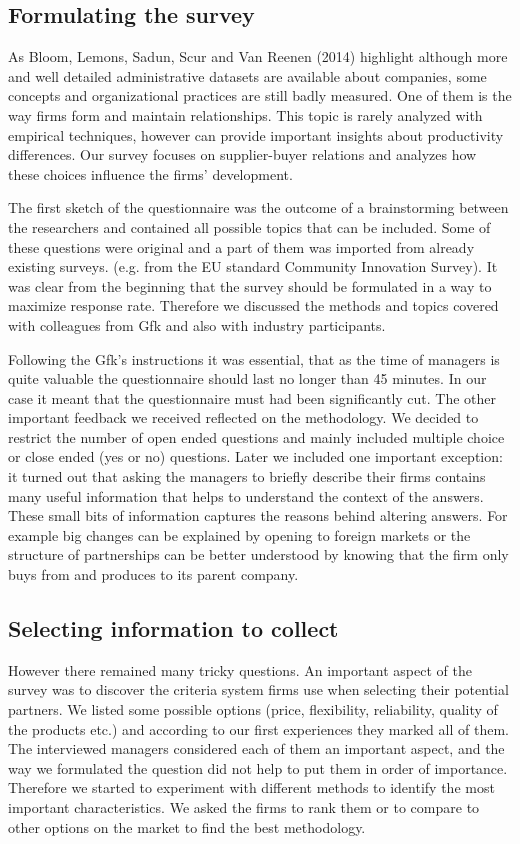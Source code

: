\documentclass[final, dvipsnames, authoryear,12pt]{elsarticle}
\begin{document}
\subsection{Formulating the survey }

As Bloom, Lemons, Sadun, Scur and Van Reenen (2014) highlight although more and well detailed administrative datasets are available about companies, some concepts and organizational practices are still badly measured. One of them is the way firms form and maintain relationships. This topic is rarely analyzed with empirical techniques, however can provide important insights about productivity differences. Our survey focuses on supplier-buyer relations and analyzes how these choices influence the firms’ development.

The first sketch of the questionnaire was the outcome of a brainstorming between the researchers and contained all possible topics that can be included. Some of these questions were original and a part of them was imported from already existing surveys. (e.g. from the EU standard Community Innovation Survey). It was clear from the beginning that the survey should be formulated in a way to maximize response rate. Therefore we discussed the methods and topics covered with colleagues from Gfk and also with industry participants.

Following the Gfk’s instructions it was essential, that as the time of managers is quite valuable the questionnaire should last no longer than 45 minutes. In our case it meant that the questionnaire must had been significantly cut. The other important feedback we received reflected on the methodology. We decided to restrict the number of open ended questions and mainly included multiple choice or close ended (yes or no) questions. Later we included one important exception: it turned out that asking the managers to briefly describe their firms contains many useful information that helps to understand the context of the answers. These small bits of information captures the reasons behind altering answers. For example big changes can be explained by opening to foreign markets or the structure of partnerships can be better understood by knowing that the firm only buys from and produces to its parent company.

\subsection{Selecting information to collect}

However there remained many tricky questions. An important aspect of the survey was to discover the criteria system firms use when selecting their potential partners. We listed some possible options (price, flexibility, reliability, quality of the products etc.) and according to our first experiences they marked all of them. The interviewed managers considered each of them an important aspect, and the way we formulated the question did not help to put them in order of importance.  Therefore we started to experiment with different methods to identify the most important characteristics. We asked the firms to rank them or to compare to other options on the market to find the best methodology.
\end{document}
